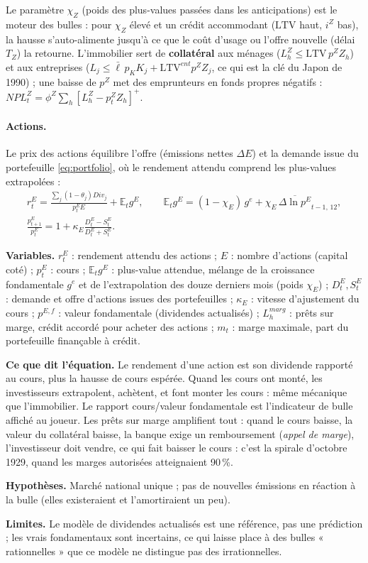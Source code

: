 \documentclass[11pt,a4paper]{article}
\newcommand{\variables}{\par\noindent\textbf{Variables.} }
\newcommand{\sens}{\par\noindent\textbf{Ce que dit l'équation.} }
\newcommand{\hyp}{\par\noindent\textbf{Hypothèses.} }
\newcommand{\limites}{\par\noindent\textbf{Limites.} }
\newcommand{\E}{\mathbb{E}}
\newcommand{\pos}[1]{{\left[#1\right]^{+}}}
\begin{document}
Le paramètre $\chi_Z$ (poids des plus-values passées dans les anticipations) est le moteur des bulles : pour $\chi_Z$ élevé et un crédit accommodant ($\mathrm{LTV}$ haut, $i^Z$ bas), la hausse s'auto-alimente jusqu'à ce que le coût d'usage ou l'offre nouvelle (délai $T_Z$) la retourne. L'immobilier sert de \textbf{collatéral} aux ménages ($L^Z_h \le \mathrm{LTV}\, p^Z Z_h$) et aux entreprises ($L_j \le \bar\ell\, p_K K_j + \mathrm{LTV}^{ent} p^Z Z_j$, ce qui est la clé du Japon de 1990) ; une baisse de $p^Z$ met des emprunteurs en fonds propres négatifs : $NPL^Z_t = \phi^Z \sum_h \pos{L^Z_h - p^Z_t Z_h}$.

\paragraph{Actions.} Le prix des actions équilibre l'offre (émissions nettes $\Delta E$) et la demande issue du portefeuille \eqref{eq:portfolio}, où le rendement attendu comprend les plus-values extrapolées :
\begin{equation}
\begin{split}
r^E_t = \frac{\sum_j (1-\theta_j)Div_j}{p^E_t E} + \E_t g^E, \qquad
\E_t g^E = (1-\chi_E)\, g^e + \chi_E\, \overline{\Delta \ln p^E}_{t-1,\,12},\\[2pt]
\frac{p^E_{t+1}}{p^E_t} = 1 + \kappa_E \frac{D^E_t - S^E_t}{D^E_t + S^E_t}.
\end{split}
\label{eq:pe}
\end{equation}
\begin{lecture}
\variables $r^E_t$ : rendement attendu des actions ; $E$ : nombre d'actions (capital coté) ; $p^E_t$ : cours ; $\E_t g^E$ : plus-value attendue, mélange de la croissance fondamentale $g^e$ et de l'extrapolation des douze derniers mois (poids $\chi_E$) ; $D^E_t, S^E_t$ : demande et offre d'actions issues des portefeuilles ; $\kappa_E$ : vitesse d'ajustement du cours ; $p^{E,f}$ : valeur fondamentale (dividendes actualisés) ; $L^{marg}_h$ : prêts sur marge, crédit accordé pour acheter des actions ; $m_t$ : marge maximale, part du portefeuille finançable à crédit.
\sens Le rendement d'une action est son dividende rapporté au cours, plus la hausse de cours espérée. Quand les cours ont monté, les investisseurs extrapolent, achètent, et font monter les cours : même mécanique que l'immobilier. Le rapport cours/valeur fondamentale est l'indicateur de bulle affiché au joueur. Les prêts sur marge amplifient tout : quand le cours baisse, la valeur du collatéral baisse, la banque exige un remboursement (\emph{appel de marge}), l'investisseur doit vendre, ce qui fait baisser le cours : c'est la spirale d'octobre 1929, quand les marges autorisées atteignaient 90\,\%.
\hyp Marché national unique ; pas de nouvelles émissions en réaction à la bulle (elles existeraient et l'amortiraient un peu).
\limites Le modèle de dividendes actualisés est une référence, pas une prédiction ; les vrais fondamentaux sont incertains, ce qui laisse place à des bulles « rationnelles » que ce modèle ne distingue pas des irrationnelles.
\end{lecture}
\end{document}

